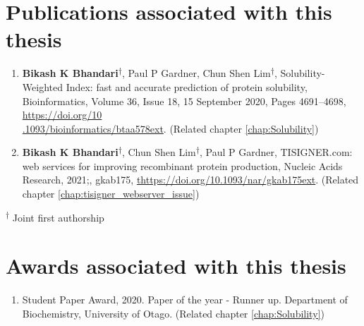 \section*{Publications associated with this thesis}
\begin{enumerate}
	\item \textbf{Bikash K Bhandari}\textsuperscript{$\dagger$}, Paul P Gardner, Chun Shen Lim\textsuperscript{$\dagger$}, Solubility-Weighted Index: fast and accurate prediction of protein solubility, Bioinformatics, Volume 36, Issue 18, 15 September 2020, Pages 4691–4698, \href{https://doi.org/10.1093/bioinformatics/btaa578}{https://doi.org/10\\.1093/bioinformatics/btaa578ext}. (Related chapter \ref{chap:Solubility})
	
	
	\item \textbf{Bikash K Bhandari}\textsuperscript{$\dagger$}, Chun Shen Lim\textsuperscript{$\dagger$}, Paul P Gardner, TISIGNER.com: web services for improving recombinant protein production, Nucleic Acids Research, 2021;, gkab175, \href{https://doi.org/10.1093/nar/gkab175}{thttps://doi.org/10.1093/nar/gkab175ext}. (Related chapter \ref{chap:tisigner_webserver_issue})
	
\end{enumerate}

\textsuperscript{$\dagger$} Joint first authorship



\section*{Awards associated with this thesis}
\begin{enumerate}
	\item Student Paper Award, 2020. Paper of the year - Runner up. Department of Biochemistry, University of Otago. (Related chapter \ref{chap:Solubility})

\end{enumerate}